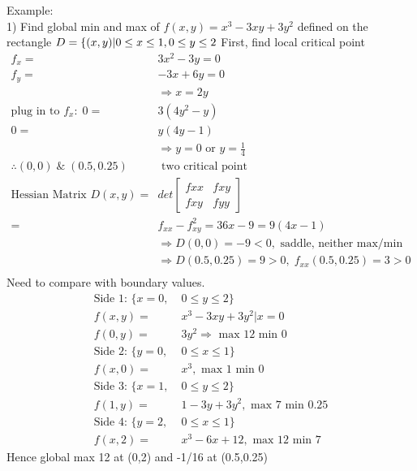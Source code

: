 \documentclass{article}
\begin{document}
        Example: \\
        
        1) Find global min and max of $f(x,y) = x^3-3xy + 3y^2$ defined on the rectangle $D = \{(x,y)|0\leq x\leq 1, 0\leq y \leq2\\$ First, find local critical point
        \begin{align}
            f_x =& 3x^2 - 3y = 0\\
            f_y =& -3x + 6y = 0\\
            &\Rightarrow x = 2y\\
            \text{plug in to }f_x:\;0 =& 3(4y^2-y)\\
            0 =& y(4y-1)\\
            &\Rightarrow y=0 \text{ or } y=\frac{1}{4}\\
            \therefore (0,0)\;\&\;(0.5,0.25)& \text{ two critical point}\\
            \text{Hessian Matrix }D(x,y) =& det\left[\begin{array}{cc}
                                                fxx & fxy\\
                                                fxy & fyy
                                            \end{array}\right]\\
            =& f_{xx} - f_{xy}^2 = 36x-9 = 9(4x - 1)\\
            &\Rightarrow D(0,0) = -9 < 0,\text{ saddle, neither max/min}\\
            &\Rightarrow D(0.5,0.25) = 9 > 0,\;f_{xx}(0.5,0.25) = 3>0\\
        \end{align}
        Need to compare with boundary values.
        \begin{align}
            \text{Side 1: }\{x=0,\;& 0\leq y\leq2\}\\
            f(x,y) =& x^3 - 3xy + 3y^2|{x=0}\\
            f(0,y) =& 3y^2 \Rightarrow\text{ max 12 min 0}\\
            \text{Side 2: }\{y=0,\;& 0\leq x\leq1\}\\
            f(x,0) =& x^3,\text{ max 1 min 0}\\ 
            \text{Side 3: }\{x=1,\;& 0\leq y\leq2\}\\
            f(1,y) =& 1-3y+3y^2,\text{ max 7 min 0.25}\\
            \text{Side 4: }\{y=2,\;& 0\leq x\leq1\}\\
            f(x,2) =& x^3-6x+12,\text{ max 12 min 7}
        \end{align}
        Hence global max 12 at (0,2) and -1/16 at (0.5,0.25)
        
\end{document}
